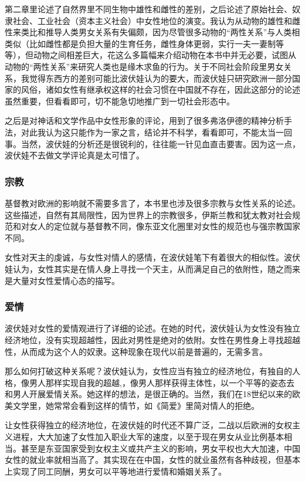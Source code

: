 第二章里论述了自然界里不同生物中雄性和雌性的差别，之后论述了原始社会、奴隶社会、工业社会（资本主义社会）中女性地位的演变。我认为从动物的雄性和雌性来类比和推导人类男女关系有失偏颇，因为尽管很多动物的“两性关系”与人类相类似（比如雌性都是负担大量的生育任务，雌性身体更弱，实行一夫一妻制等等），但动物之间相差巨大，花这么多篇幅来介绍动物在本书中并无必要，试图从动物的“两性关系”来研究人类也是缘木求鱼的行为。关于不同社会阶段里男女关系，我觉得东西方的差别可能比波伏娃认为的要大，而波伏娃只研究欧洲一部分国家的风俗，诸如女性有继承权这样的社会习惯在中国就不存在，因此这部分的论述虽然重要，但看看即可，切不能急切地推广到一切社会形态中。

之后是对神话和文学作品中女性形象的评论，用到了很多弗洛伊德的精神分析手法，对此我认为这只能作为一家之言，结论并不科学，看看即可，不能太当一回事。当然，波伏娃的分析还是很锐利的，往往能一针见血直击要害。因为这一点，波伏娃不去做文学评论真是太可惜了。

\subsubsection{宗教}
基督教对欧洲的影响就不需要多言了，本书里也涉及很多宗教与女性关系的论述。这些描述，自然有其局限性，因为世界上的宗教很多，伊斯兰教和犹太教对社会规范和对女人的定位就与基督教不同，像东亚文化圈里对女性的规范也与强宗教国家不同。

女性对天主的虔诚，与女性对情人的感情，在波伏娃笔下有着很大的相似性。波伏娃认为，女性其实是在情人身上寻找一个天主，从而满足自己的依附性，随之而来是大量对女性爱情心态的描写。

\subsubsection{爱情}
波伏娃对女性的爱情观进行了详细的论述。在她的时代，波伏娃认为女性没有独立经济地位，没有实现超越性，因此对男性是绝对的依附。女性在男性身上寻找超越性，从而成为这个人的奴隶。这种现象在现代以前是普遍的，无需多言。

那么如何打破这种关系呢？波伏娃认为，女性应当有独立的经济地位，有独自的人格，像男人那样实现自我的超越,，像男人那样获得主体性，以一个平等的姿态去和男人开展爱情关系。她这样的想法，是很正确的。当然，我们在18世纪以来的欧美文学里，她常常会看到这样的情节，如《简爱》里简对情人的拒绝。

让女性获得独立的经济地位，在波伏娃的时代还不算广泛，二战以后欧洲的女权主义进程，大大加速了女性加入职业大军的速度，以至于现在男女从业比例基本相当。甚至是东亚国家受到女权主义或共产主义的影响，男女平权也大大加速，中国女性的就业率就相当高了。其实现在在中国，女性的就业虽然有各种歧视，但基本上实现了同工同酬，男女可以平等地进行爱情和婚姻关系了。

